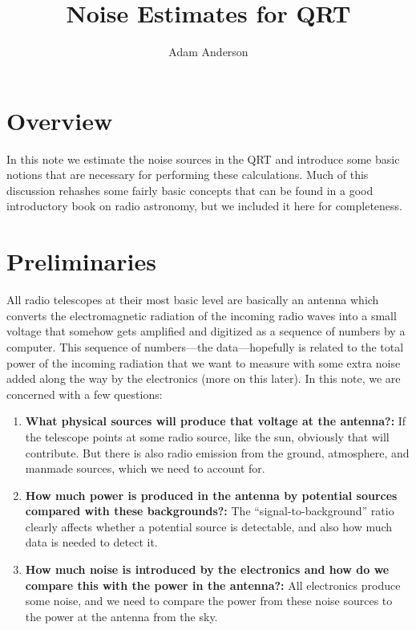 \documentclass[11pt]{amsart}
\title{Noise Estimates for QRT}
\author{Adam Anderson}
\begin{document}
\maketitle
\section{Overview}
In this note we estimate the noise sources in the QRT and introduce some basic notions that are necessary for performing these calculations. Much of this discussion rehashes some fairly basic concepts that can be found in a good introductory book on radio astronomy, but we included it here for completeness.


\section{Preliminaries}
All radio telescopes at their most basic level are basically an antenna which converts the electromagnetic radiation of the incoming radio waves into a small voltage that somehow gets amplified and digitized as a sequence of numbers by a computer. This sequence of numbers---the data---hopefully is related to the total power of the incoming radiation that we want to measure with some extra noise added along the way by the electronics (more on this later). In this note, we are concerned with a few questions:
\begin{enumerate}
\item {\bf What physical sources will produce that voltage at the antenna?:} If the telescope points at some radio source, like the sun, obviously that will contribute. But there is also radio emission from the ground, atmosphere, and manmade sources, which we need to account for.
\item {\bf How much power is produced in the antenna by potential sources compared with these backgrounds?:} The ``signal-to-background'' ratio clearly affects whether a potential source is detectable, and also how much data is needed to detect it.
\item {\bf How much noise is introduced by the electronics and how do we compare this with the power in the antenna?:} All electronics produce some noise, and we need to compare the power from these noise sources to the power at the antenna from the sky.
\end{enumerate}
\end{document}
